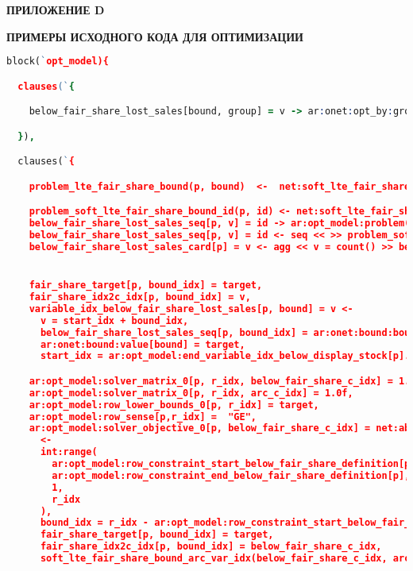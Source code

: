 \newpage
\begin{flushright}
\textbf{\MakeUppercase{Приложение D}}
\end{flushright}
\begin{center}
\textbf{\MakeUppercase{Примеры исходного кода для оптимизации}}
\end{center}

\begin{lstlisting}[language=Prolog]
block(`opt_model){

  clauses(`{

    below_fair_share_lost_sales[bound, group] = v -> ar:onet:opt_by:group(group), float(v), ar:onet:bound:bound(bound).

  }),

  clauses(`{

    problem_lte_fair_share_bound(p, bound)  <-  net:soft_lte_fair_share(bound), ar:opt_model:problem_bound(p, bound).

    problem_soft_lte_fair_share_bound_id(p, id) <- net:soft_lte_fair_share(bound), ar:opt_model:problem_bound(p, bound), ar:onet:bound:bound_id[bound] = id.
    below_fair_share_lost_sales_seq[p, v] = id -> ar:opt_model:problem(p), int(v), int(id).
    below_fair_share_lost_sales_seq[p, v] = id <- seq << >> problem_soft_lte_fair_share_bound_id(p, id).
    below_fair_share_lost_sales_card[p] = v <- agg << v = count() >> below_fair_share_lost_sales_seq[p, _] = _.


    fair_share_target[p, bound_idx] = target,
    fair_share_idx2c_idx[p, bound_idx] = v,
    variable_idx_below_fair_share_lost_sales[p, bound] = v <-
      v = start_idx + bound_idx,
      below_fair_share_lost_sales_seq[p, bound_idx] = ar:onet:bound:bound_id[bound],
      ar:onet:bound:value[bound] = target,
      start_idx = ar:opt_model:end_variable_idx_below_display_stock[p].

    ar:opt_model:solver_matrix_0[p, r_idx, below_fair_share_c_idx] = 1.0f,
    ar:opt_model:solver_matrix_0[p, r_idx, arc_c_idx] = 1.0f,
    ar:opt_model:row_lower_bounds_0[p, r_idx] = target,
    ar:opt_model:row_sense[p,r_idx] =  "GE",
    ar:opt_model:solver_objective_0[p, below_fair_share_c_idx] = net:above_fair_share_penalty_default[]
      <-
      int:range(
        ar:opt_model:row_constraint_start_below_fair_share_definition[p],
        ar:opt_model:row_constraint_end_below_fair_share_definition[p],
        1,
        r_idx
      ),
      bound_idx = r_idx - ar:opt_model:row_constraint_start_below_fair_share_definition[p],
      fair_share_target[p, bound_idx] = target,
      fair_share_idx2c_idx[p, bound_idx] = below_fair_share_c_idx,
      soft_lte_fair_share_bound_arc_var_idx(below_fair_share_c_idx, arc_c_idx).


\end{lstlisting}
